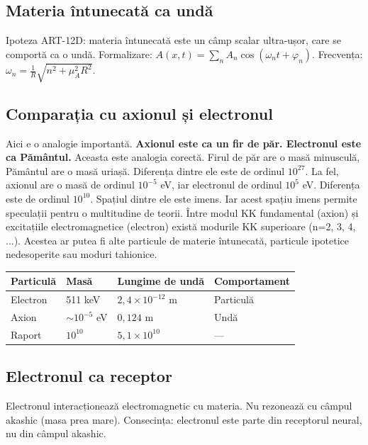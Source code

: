 \documentclass[11pt,a4paper]{article}
\begin{document}
\subsection{Materia întunecată ca undă}
Ipoteza ART-12D: materia întunecată este un câmp scalar ultra-ușor, care se comportă ca o undă. Formalizare: $A(x,t) = \sum_n A_n \cos(\omega_n t + \varphi_n)$. Frecvența: $\omega_n = \frac{1}{R} \sqrt{n^2 + \mu_A^2 R^2}$.

\subsection{Comparația cu axionul și electronul}
Aici e o analogie importantă. \textbf{Axionul este ca un fir de păr. Electronul este ca Pământul.} Aceasta este analogia corectă. Firul de păr are o masă minusculă, Pământul are o masă uriașă. Diferența dintre ele este de ordinul $10^{27}$. La fel, axionul are o masă de ordinul $10^{-5}$ eV, iar electronul de ordinul $10^5$ eV. Diferența este de ordinul $10^{10}$. Spațiul dintre ele este imens. Iar acest spațiu imens permite speculații pentru o multitudine de teorii. Între modul KK fundamental (axion) și excitațiile electromagnetice (electron) există modurile KK superioare (n=2, 3, 4, ...). Acestea ar putea fi alte particule de materie întunecată, particule ipotetice nedesoperite sau moduri tahionice.

\begin{table}[H]
\centering
\begin{tabular}{@{}llll@{}}
\toprule
\textbf{Particulă} & \textbf{Masă} & \textbf{Lungime de undă} & \textbf{Comportament} \\ \midrule
Electron & 511 keV & $2{,}4\times10^{-12}$ m & Particulă \\
Axion & $\sim 10^{-5}$ eV & $0{,}124$ m & Undă \\
Raport & $10^{10}$ & $5{,}1\times10^{10}$ & — \\ \bottomrule
\end{tabular}
\end{table}

\subsection{Electronul ca receptor}
Electronul interacționează electromagnetic cu materia. Nu rezonează cu câmpul akashic (masa prea mare). Consecința: electronul este parte din receptorul neural, nu din câmpul akashic.
\end{document}

